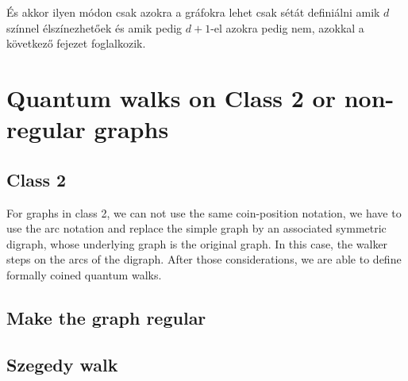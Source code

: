 És akkor ilyen módon csak azokra a gráfokra lehet csak sétát definiálni amik $d$ színnel élszínezhetőek és amik pedig $d+1$-el azokra pedig nem, azokkal a következő fejezet foglalkozik.

\section{Quantum walks on Class 2 or non-regular graphs}

\subsection{Class 2}

For graphs in class 2, we can not use the same coin-position notation, we have to use the arc notation and replace the simple graph by an associated symmetric digraph, whose underlying graph is the original graph. In this case, the walker steps on the arcs of the digraph. After those considerations, we are able to define formally coined quantum walks.

\subsection{Make the graph regular}


\subsection{Szegedy walk}

